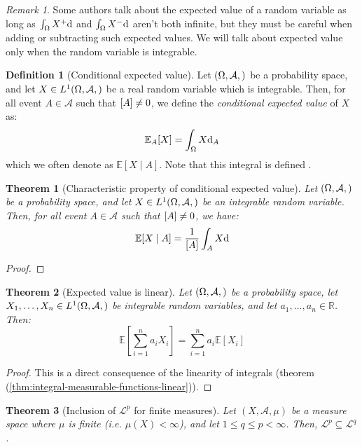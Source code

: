 \documentclass{article}
\newtheorem{theorem}{Theorem}[section]
\theoremstyle{definition}
\newtheorem{definition}{Definition}[section]
\theoremstyle{remark}
\newtheorem*{remark}{Remark}
\theoremstyle{example}
\theoremstyle{notation}
\theoremstyle{axiom}
\newcommand{\E}[1]{\mathbb{E}[#1]}
\let\P\relax
\begin{document}
\begin{remark}
		Some authors talk about the expected value of a random variable as long as $\int_\Omega X^+ \dd \P$ and $\int_\Omega X^- \dd \P$ aren't both infinite, but they must be careful when adding or subtracting such expected values. We will talk about expected value only when the random variable is integrable.
\end{remark}

\begin{definition}[Conditional expected value] %
		Let $(\Omega, \mathcal{A}, \P)$ be a probability space, and let $X \in L^1(\Omega, \mathcal{A}, \P)$ be a real random variable which is integrable. Then, for all event $A \in \mathcal{A}$ such that $\P[A] \neq 0$, we define the \textit{conditional expected value} of $X$ as:
				$$\mathbb{E}_A[X] = \int_\Omega X \dd \P_A$$
		which we often denote as $\E{X \mid A}$. Note that this integral is defined \fbox{because $L^1(\Omega, \mathcal{A}, \P) = L^1(\Omega, \mathcal{A}, \P_A)$}.
\end{definition}

\begin{theorem}[Characteristic property of conditional expected value] 
		Let $(\Omega, \mathcal{A}, \P)$ be a probability space, and let $X \in L^1(\Omega, \mathcal{A}, \P)$ be an integrable random variable. Then, for all event $A \in \mathcal{A}$ such that $\P[A] \neq 0$, we have:
				$$\E{X \mid A} = \frac{1}{\P[A]}\int_A X \dd \P$$
\end{theorem}

\begin{proof}
\end{proof}

\begin{theorem}[Expected value is linear]
		Let $(\Omega, \mathcal{A}, \P)$ be a probability space, let $X_1, \dots, X_n \in L^1(\Omega, \mathcal{A}, \P)$ be integrable random variables, and let $a_1, \dots, a_n \in \mathbb{R}$. Then:
				$$\E{\sum_{i=1}^n a_i X_i} = \sum_{i=1}^n a_i \E{X_i}$$
\end{theorem}

\begin{proof}
		This is a direct consequence of the linearity of integrals (theorem (\ref{thm:integral-measurable-functions-linear})).
\end{proof}

\begin{theorem}[Inclusion of $\mathcal{L}^p$ for finite measures] \label{thm:inclusion-Lp} %
		Let $(X, \mathcal{A}, \mu)$ be a measure space where $\mu$ is finite (i.e. $\mu(X) < \infty$), and let $1 \leq q \leq p < \infty$. Then, $\mathcal{L}^p \subseteq \mathcal{L}^q$.
\end{theorem}
\end{document}
